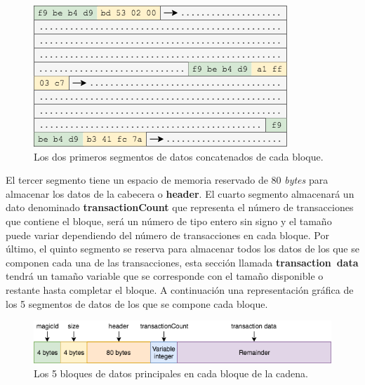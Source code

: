 \documentclass{article}
\begin{document}
    \begin{figure}[H]
    \centering
        \includegraphics[scale=0.61]{img/Bitcoin_SHA_256-Block_delimitadores_de_datos.png}
        \caption{Los dos primeros segmentos de datos concatenados de cada bloque.}
    \end{figure}
    
    El tercer segmento tiene un espacio de memoria reservado de 80 \textit{bytes} para almacenar los datos de la cabecera o \textbf{header}. El cuarto segmento almacenará un dato denominado \textbf{transactionCount} que representa el número de transacciones que contiene el bloque, será un número de tipo entero sin signo y el tamaño puede variar dependiendo del número de transacciones en cada bloque. Por último, el quinto segmento se reserva para almacenar todos los datos de los que se componen cada una de las transacciones, esta sección llamada \textbf{transaction\ data} tendrá un tamaño variable que se corresponde con el tamaño disponible o restante hasta completar el bloque. A continuación una representación gráfica de los 5 segmentos de datos de los que se compone cada bloque.
    
    \begin{figure}[H]
    \centering
        \includegraphics[scale=0.57]{img/Bitcoin_SHA_256-Block_data}
        \caption{Los 5 bloques de datos principales en cada bloque de la cadena.}
    \end{figure}
    
\end{document}
